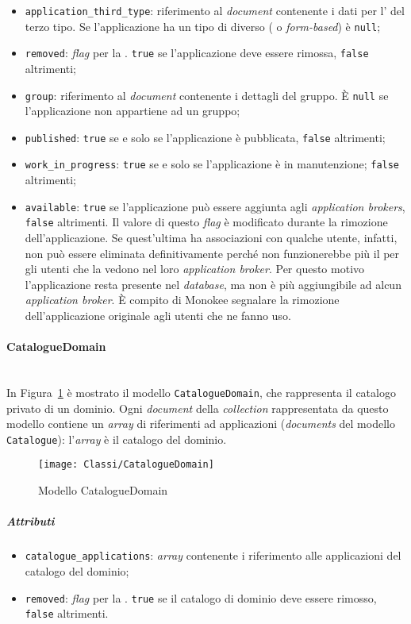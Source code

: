 \begin{itemize}
\item \texttt{application\_third\_type}: riferimento al \textit{document} contenente i dati per l' del terzo tipo. Se l'applicazione ha un tipo di  diverso ( o  \textit{form-based}) è \texttt{null};
\item \texttt{removed}: \textit{flag} per la . \texttt{true} se l'applicazione deve essere rimossa, \texttt{false} altrimenti;
\item \texttt{group}: riferimento al \textit{document} contenente i dettagli del gruppo. È \texttt{null} se l'applicazione non appartiene ad un gruppo;
\item \texttt{published}: \texttt{true} se e solo se l'applicazione è pubblicata, \texttt{false} altrimenti;
\item \texttt{work\_in\_progress}: \texttt{true} se e solo se l'applicazione è in manutenzione; \texttt{false} altrimenti;
\item \texttt{available}: \texttt{true} se l'applicazione può essere aggiunta agli \textit{application brokers}, \texttt{false} altrimenti. Il valore di questo \textit{flag} è modificato durante la rimozione dell'applicazione. Se quest'ultima ha associazioni con qualche utente, infatti, non può essere eliminata definitivamente perché non funzionerebbe più il  per gli utenti che la vedono nel loro \textit{application broker}. Per questo motivo l'applicazione resta presente nel \textit{database}, ma non è più aggiungibile ad alcun \textit{application broker}. È compito di Monokee segnalare la rimozione dell'applicazione originale agli utenti che ne fanno uso.
\end{itemize}

\paragraph{CatalogueDomain} \mbox{} \\
In Figura~\ref{fig:CatalogueDomain} è mostrato il modello \texttt{CatalogueDomain}, che rappresenta il catalogo privato di un dominio. Ogni \textit{document} della \textit{collection} rappresentata da questo modello contiene un \textit{array} di riferimenti ad applicazioni (\textit{documents} del modello \texttt{Catalogue}): l'\textit{array} è il catalogo del dominio.
\begin{figure}[h]
  \begin{center}
    \texttt{[image: Classi/CatalogueDomain]}
  \caption[Modello CatalogueDomain]{Modello CatalogueDomain}
  \label{fig:CatalogueDomain}
  \end{center} 
\end{figure}
\subparagraph{Attributi}
\begin{itemize}
\item \texttt{catalogue\_applications}: \textit{array} contenente i riferimento alle applicazioni del catalogo del dominio;
\item \texttt{removed}: \textit{flag} per la . \texttt{true} se il catalogo di dominio deve essere rimosso, \texttt{false} altrimenti.
\end{itemize}

